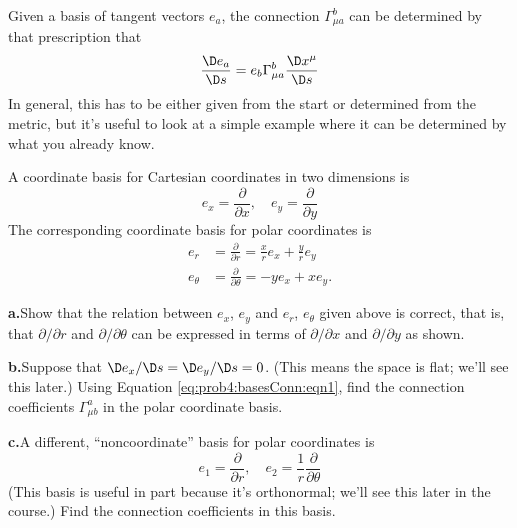 \begin{xca}
Given a basis of tangent vectors $e_{a}$, the connection
$\Gamma^{b}_{\mu a}$ can be determined by that prescription that
\begin{equation}\label{eq:prob4:basesConn:eqn1}
\frac{\D e_{a}}{\D s}=e_{b}\Gamma^{b}_{\mu a}\frac{\D x^{\mu}}{\D s}
\end{equation}
In general, this has to be either given from the start or
determined from the metric, but it's useful to look at a simple
example where it can be determined by what you already know. 

A coordinate basis for Cartesian coordinates in two dimensions is
\begin{equation}
e_{x}=\frac{\partial}{\partial x},\quad
e_{y}=\frac{\partial}{\partial y}
\end{equation}
The corresponding coordinate basis for polar coordinates is
\begin{equation}
\begin{split}
e_{r}&=\frac{\partial}{\partial r}=\frac{x}{r}e_{x}+\frac{y}{r}e_{y}\\
e_{\theta}&=\frac{\partial}{\partial\theta}=-ye_{x}+xe_{y}.
\end{split}
\end{equation}

\noindent\textbf{a.\quad}Show that the relation between $e_x$, $e_y$
and $e_r$, $e_\theta$ given above is correct, that is, that
$\partial/\partial r$ and $\partial/\partial\theta$ can be
expressed in terms of $\partial/\partial x$ and
$\partial/\partial y$ as shown.

\medbreak
\noindent\textbf{b.\quad}Suppose that $\D e_{x}/\D s = \D e_y/\D s =
0$. (This means the space is flat; we'll see this later.) 
Using Equation \eqref{eq:prob4:basesConn:eqn1}, find the
connection coefficients $\Gamma^{a}_{\mu b}$ in the polar coordinate basis.

\medbreak
\noindent\textbf{c.\quad}A different, ``noncoordinate'' basis for
polar coordinates is 
\begin{equation}
e_1 = \frac{\partial}{\partial r},\quad
e_{2}=\frac{1}{r}\frac{\partial}{\partial\theta}
\end{equation}
(This basis is useful in part because it's orthonormal; we'll see
this later in the course.) Find the connection coefficients in this basis.
\end{xca}
